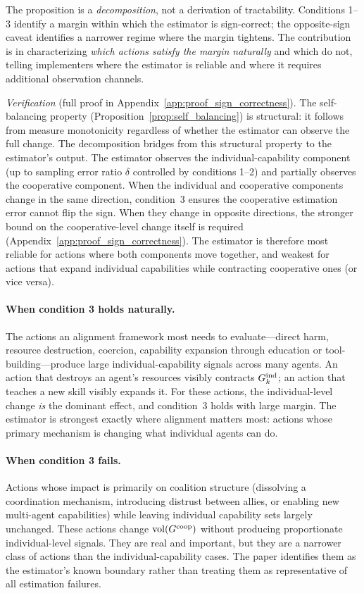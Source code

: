 The proposition is a \emph{decomposition}, not a derivation of tractability.
Conditions 1--3 identify a margin within which the estimator is sign-correct;
the opposite-sign caveat identifies a narrower regime where the margin
tightens. The contribution is in characterizing \emph{which actions satisfy
the margin naturally} and which do not, telling implementers where the
estimator is reliable and where it requires additional observation channels.

\emph{Verification} (full proof in Appendix~\ref{app:proof_sign_correctness}).
The self-balancing property
(Proposition~\ref{prop:self_balancing}) is structural: it follows from measure
monotonicity regardless of whether the estimator can observe the full change.
The decomposition bridges from this structural property to the estimator's
output. The estimator observes the individual-capability component (up to
sampling error ratio $\delta$ controlled by conditions 1--2) and partially
observes the cooperative component. When the individual and cooperative
components change in the same direction, condition~3 ensures the cooperative
estimation error cannot flip the sign. When they change in opposite
directions, the stronger bound on the cooperative-level change itself is
required (Appendix~\ref{app:proof_sign_correctness}). The estimator is
therefore most reliable for actions where both components move together, and
weakest for actions that expand individual capabilities while contracting
cooperative ones (or vice versa).

\paragraph{When condition 3 holds naturally.} The actions an alignment
framework most needs to evaluate---direct harm, resource destruction, coercion,
capability expansion through education or tool-building---produce large
individual-capability signals across many agents. An action that destroys an
agent's resources visibly contracts $G_{k}^{\mathrm{ind}}$; an action that teaches a new
skill visibly expands it. For these actions, the individual-level change
\emph{is} the dominant effect, and condition~3 holds with large margin. The
estimator is strongest exactly where alignment matters most: actions whose
primary mechanism is changing what individual agents can do.

\paragraph{When condition 3 fails.} Actions whose impact is primarily on
coalition structure (dissolving a coordination mechanism, introducing distrust
between allies, or enabling new multi-agent capabilities) while leaving
individual capability sets largely unchanged. These actions change
$\operatorname{vol}(G^{\mathrm{coop}})$ without producing proportionate individual-level signals. They
are real and important, but they are a narrower class of actions than the
individual-capability cases. The paper identifies them as the estimator's known
boundary rather than treating them as representative of all estimation
failures.

